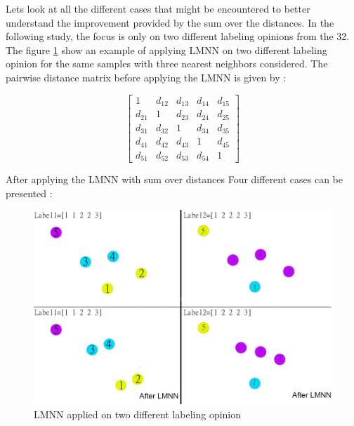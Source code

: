 \documentclass[hidelinks,12pt]{report}
\begin{document}
\begin{enumerate}
 
 
 
 
Lets look at all the different cases that might be encountered to better understand the improvement provided by the sum over the distances. In the following study, the focus is only on two different labeling opinions from the 32. The figure \ref{Lmnnsum} show an example of applying LMNN on two different labeling opinion for the same samples with three nearest neighbors considered. The pairwise distance matrix before applying the LMNN is given by :

\[
\begin{bmatrix}
    1            & d_{12} & d_{13}  & d_{14}  & d_{15} \\
    d_{21}       & 1      & d_{23}  & d_{24}  & d_{25} \\
    d_{31}       & d_{32} & 1       & d_{34}  & d_{35} \\
    d_{41}       & d_{42} & d_{43}  & 1       & d_{45} \\
    d_{51}       & d_{52} & d_{53}  & d_{54}  & 1
\end{bmatrix}
\]

After applying the LMNN with sum over distances Four different cases can be presented :
\begin{figure}[t!]
  
  \centering
	    \includegraphics[width=1\textwidth]{lmnnex1}
    \caption{LMNN applied on two different labeling opinion}
    \label{Lmnnsum}
\end{figure}


\end{enumerate}
\end{document}
